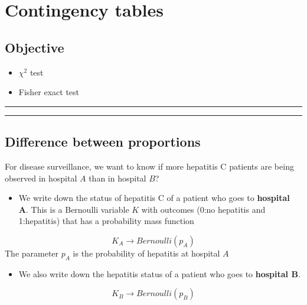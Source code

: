 \documentclass[
]{book}
\providecommand{\tightlist}{%
  \setlength{\itemsep}{0pt}\setlength{\parskip}{0pt}}
\begin{document}
\hypertarget{contingency-tables-1}{%
\chapter{Contingency tables}\label{contingency-tables-1}}

\hypertarget{objective-14}{%
\section{Objective}\label{objective-14}}

\begin{itemize}
\tightlist
\item
  \(\chi^2\) test
\item
  Fisher exact test
\end{itemize}

\begin{center}\rule{0.5\linewidth}{0.5pt}\end{center}

\begin{center}\rule{0.5\linewidth}{0.5pt}\end{center}

\hypertarget{difference-between-proportions}{%
\section{Difference between proportions}\label{difference-between-proportions}}

For disease surveillance, we want to know if more hepatitis C patients are being observed in hospital \(A\) than in hospital \(B\)?

\begin{itemize}
\tightlist
\item
  We write down the status of hepatitis C of a patient who goes to \textbf{hospital A}. This is a Bernoulli variable \(K\) with outcomes (0:no hepatitis and 1:hepatitis) that has a probability mass function
\end{itemize}

\[K_A \rightarrow Bernoulli (p_A)\]
The parameter \(p_A\) is the probability of hepatitis at hospital \(A\)

\begin{itemize}
\tightlist
\item
  We also write down the hepatitis status of a patient who goes to \textbf{hospital B}.
\end{itemize}

\[K_B \rightarrow Bernoulli (p_B)\]
\end{document}
